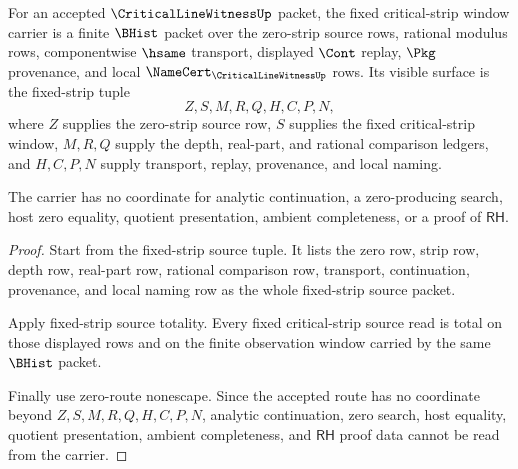\begin{theorem}
\label{thm:critical-line-witness-fixed-strip-window-carrier}
For an accepted $\CriticalLineWitnessUp$ packet, the fixed critical-strip window carrier is a finite $\BHist$ packet over the zero-strip source rows, rational modulus rows, componentwise $\hsame$ transport, displayed $\Cont$ replay, $\Pkg$ provenance, and local $\NameCert_{\CriticalLineWitnessUp}$ rows. Its visible surface is the fixed-strip tuple
$$
Z,S,M,R,Q,H,C,P,N,
$$
where $Z$ supplies the zero-strip source row, $S$ supplies the fixed critical-strip window, $M,R,Q$ supply the depth, real-part, and rational comparison ledgers, and $H,C,P,N$ supply transport, replay, provenance, and local naming.

The carrier has no coordinate for analytic continuation, a zero-producing search, host zero equality, quotient presentation, ambient completeness, or a proof of $\mathsf{RH}$.
\end{theorem}
\begin{proof}
Start from the fixed-strip source tuple. It lists the zero row, strip row, depth row, real-part row, rational comparison row, transport, continuation, provenance, and local naming row as the whole fixed-strip source packet.

Apply fixed-strip source totality. Every fixed critical-strip source read is total on those displayed rows and on the finite observation window carried by the same $\BHist$ packet.

Finally use zero-route nonescape. Since the accepted route has no coordinate beyond $Z,S,M,R,Q,H,C,P,N$, analytic continuation, zero search, host equality, quotient presentation, ambient completeness, and $\mathsf{RH}$ proof data cannot be read from the carrier.
\end{proof}

